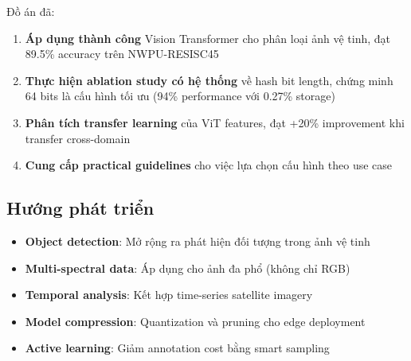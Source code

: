 \documentclass[12pt,a4paper]{article}
\begin{document}
Đồ án đã:
\begin{enumerate}
    \item \textbf{Áp dụng thành công} Vision Transformer cho phân loại ảnh vệ tinh, đạt 89.5\% accuracy trên NWPU-RESISC45
    
    \item \textbf{Thực hiện ablation study có hệ thống} về hash bit length, chứng minh 64 bits là cấu hình tối ưu (94\% performance với 0.27\% storage)
    
    \item \textbf{Phân tích transfer learning} của ViT features, đạt +20\% improvement khi transfer cross-domain
    
    \item \textbf{Cung cấp practical guidelines} cho việc lựa chọn cấu hình theo use case
\end{enumerate}

\subsection{Hướng phát triển}

\begin{itemize}
    \item \textbf{Object detection}: Mở rộng ra phát hiện đối tượng trong ảnh vệ tinh
    \item \textbf{Multi-spectral data}: Áp dụng cho ảnh đa phổ (không chỉ RGB)
    \item \textbf{Temporal analysis}: Kết hợp time-series satellite imagery
    \item \textbf{Model compression}: Quantization và pruning cho edge deployment
    \item \textbf{Active learning}: Giảm annotation cost bằng smart sampling
\end{itemize}

\end{document}
